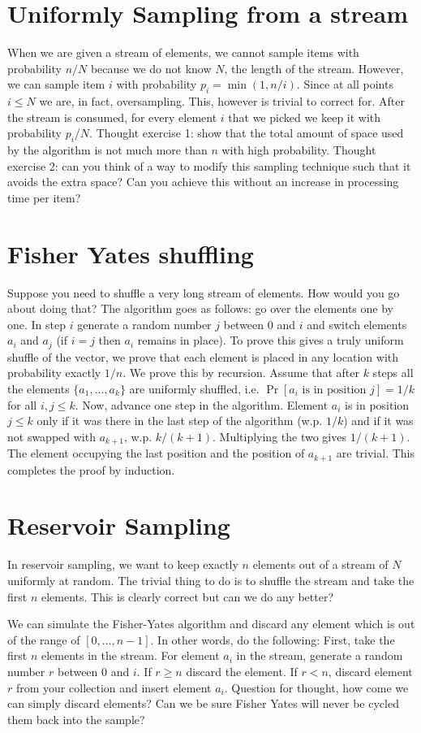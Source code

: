 \documentclass{article}
\begin{document}
\section{Uniformly Sampling from a stream}
When we are given a stream of elements, we cannot sample items with probability $n/N$ because we do not know $N$, the length of the stream.
However, we can sample item $i$ with probability $p_i = \min(1,n/i)$. Since at all points $i \le N$ we are, in fact, oversampling. 
This, however is trivial to correct for. After the stream is consumed, for every element $i$ that we picked we keep it with probability $p_i/N$.
Thought exercise 1: show that the total amount of space used by the algorithm is not much more than $n$ with high probability.
Thought exercise 2: can you think of a way to modify this sampling technique such that it avoids the extra space? Can you achieve this without an increase in processing time per item?

\section{Fisher Yates shuffling}
Suppose you need to shuffle a very long stream of elements. How would you go about doing that?
The algorithm goes as follows: go over the elements one by one.
In step $i$ generate a random number $j$ between $0$ and $i$ and switch
elements $a_i$ and $a_j$ (if $i=j$ then $a_i$ remains in place).
To prove this gives a truly uniform shuffle of the vector, we prove that each element 
is placed in any location with probability exactly $1/n$.
We prove this by recursion. Assume that after $k$ steps all the elements $\{a_1,\ldots,a_k\}$ 
are uniformly shuffled, i.e. $\Pr[a_i \mbox{ is in position } j] = 1/k$ for all $i,j \le k$. 
Now, advance one step in the algorithm.
Element $a_i$ is in position $j \le k$ only if it was there in the last step of the algorithm (w.p. $1/k$) and if
it was not swapped with $a_{k+1}$, w.p. $k/(k+1)$. Multiplying the two gives $1/(k+1)$.
The element occupying the last position and the position of $a_{k+1}$ are trivial. 
This completes the proof by induction.

\section{Reservoir Sampling}
In reservoir sampling, we want to keep exactly $n$ elements out of a stream of $N$ uniformly at random.
The trivial thing to do is to shuffle the stream and take the first $n$ elements. 
This is clearly correct but can we do any better?

We can simulate the Fisher-Yates algorithm and discard any element which is out
of the range of $[0,\ldots,n-1]$. In other words, do the following:
First, take the first $n$ elements in the stream.
For element $a_i$ in the stream, generate a random number $r$ between $0$ and $i$.
If $r \ge n$ discard the element. If $r<n$, discard element $r$ from your collection and insert element $a_i$.
Question for thought, how come we can simply discard elements? Can we be sure Fisher Yates will never be cycled them back into the sample?
\end{document}
